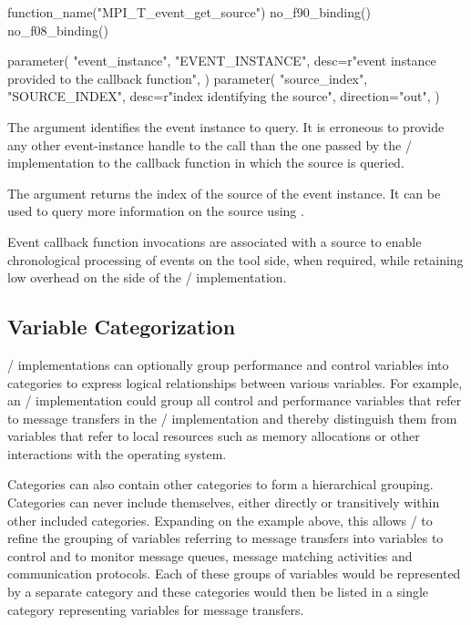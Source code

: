 \begin{mpi-binding}
    function_name("MPI_T_event_get_source")
    no_f90_binding()
    no_f08_binding()

    parameter(
        "event_instance",
        "EVENT_INSTANCE",
        desc=r"event instance provided to the callback function",
    )
    parameter(
        "source_index",
        "SOURCE_INDEX",
        desc=r"index identifying the source",
        direction="out",
    )
\end{mpi-binding}

The  argument identifies the event instance to query. It
is erroneous to provide any other event-instance handle to the call than
the one passed by the \MPI/ implementation to the callback function in
which the source is queried.

The  argument returns the index of the source of the event instance.
It can be used to query more information on the source using
.

\begin{rationale}
    Event callback function invocations are associated with a source to enable
    chronological processing of events on the tool side, when required,
    while retaining low overhead on the side of the \MPI/ implementation.
\end{rationale}

\subsection{Variable Categorization}
\label{sec:mpit:cat}

\MPI/ implementations can optionally group performance and control
variables into categories to express logical relationships between various
variables.  For example, an \MPI/ implementation could group all control
and performance variables that refer to message transfers in the \MPI/
implementation and thereby distinguish them from variables that refer to
local resources such as memory allocations or other interactions with the
operating system.

Categories can also contain other categories to form a hierarchical
grouping.  Categories can never include themselves, either directly or
transitively within other included categories.  Expanding on the example
above, this allows \MPI/ to refine the grouping of variables referring to
message transfers into variables to control and to monitor message queues,
message matching activities and communication protocols.  Each of these
groups of variables would be represented by a separate category and these
categories would then be listed in a single category representing variables
for message transfers.

